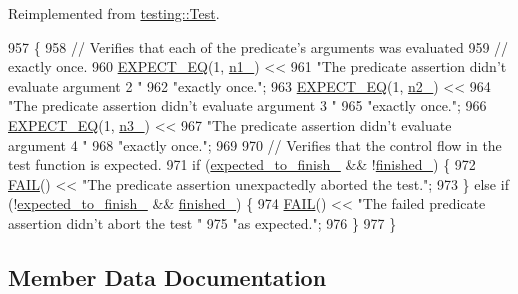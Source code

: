 Reimplemented from \hyperlink{classtesting_1_1Test_a5f0ab439802cbe0ef7552f1a9f791923}{testing\+::\+Test}.


\begin{DoxyCode}
957                           \{
958     \textcolor{comment}{// Verifies that each of the predicate's arguments was evaluated}
959     \textcolor{comment}{// exactly once.}
960     \hyperlink{gtest_8h_a4159019abda84f5366acdb7604ff220a}{EXPECT\_EQ}(1, \hyperlink{classPredicate3Test_ac232320a93f0c1e09886148a3e1929a5}{n1\_}) <<
961         \textcolor{stringliteral}{"The predicate assertion didn't evaluate argument 2 "}
962         \textcolor{stringliteral}{"exactly once."};
963     \hyperlink{gtest_8h_a4159019abda84f5366acdb7604ff220a}{EXPECT\_EQ}(1, \hyperlink{classPredicate3Test_a11049ef16bcaadc8262faf7349c7676e}{n2\_}) <<
964         \textcolor{stringliteral}{"The predicate assertion didn't evaluate argument 3 "}
965         \textcolor{stringliteral}{"exactly once."};
966     \hyperlink{gtest_8h_a4159019abda84f5366acdb7604ff220a}{EXPECT\_EQ}(1, \hyperlink{classPredicate3Test_afc1df6b079ffe22b87479b161d2ad2f7}{n3\_}) <<
967         \textcolor{stringliteral}{"The predicate assertion didn't evaluate argument 4 "}
968         \textcolor{stringliteral}{"exactly once."};
969 
970     \textcolor{comment}{// Verifies that the control flow in the test function is expected.}
971     \textcolor{keywordflow}{if} (\hyperlink{classPredicate3Test_a42c11555410ee89bf6e59d39336a212c}{expected\_to\_finish\_} && !\hyperlink{classPredicate3Test_aa2ef0fa6aed09d872fb9ae36961b49eb}{finished\_}) \{
972       \hyperlink{gtest_8h_a3e26a8d27caa386ed0ea7ce9d5b7c4ed}{FAIL}() << \textcolor{stringliteral}{"The predicate assertion unexpactedly aborted the test."};
973     \} \textcolor{keywordflow}{else} \textcolor{keywordflow}{if} (!\hyperlink{classPredicate3Test_a42c11555410ee89bf6e59d39336a212c}{expected\_to\_finish\_} && \hyperlink{classPredicate3Test_aa2ef0fa6aed09d872fb9ae36961b49eb}{finished\_}) \{
974       \hyperlink{gtest_8h_a3e26a8d27caa386ed0ea7ce9d5b7c4ed}{FAIL}() << \textcolor{stringliteral}{"The failed predicate assertion didn't abort the test "}
975                 \textcolor{stringliteral}{"as expected."};
976     \}
977   \}
\end{DoxyCode}


\subsection{Member Data Documentation}
